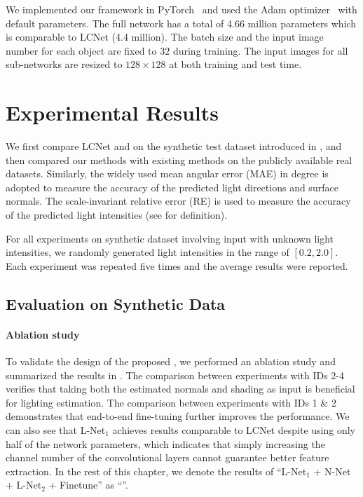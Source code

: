We implemented our framework in PyTorch~\cite{paszke2017pytorch} and used the Adam optimizer~\cite{kingma2014adam} with default parameters. 
The full network has a total of \num{4.66} million parameters which is comparable to LCNet (\num{4.4} million).
The batch size and the input image number for each object are fixed to $32$ during training.
The input images for all sub-networks are resized to $128\!\times\! 128$ at both training and test time.

\section{Experimental Results}
We first compare LCNet and \gcnetacronym on the synthetic test dataset \syntestMERL introduced in , and then compared our methods with existing methods on the publicly available real datasets. Similarly, the widely used mean angular error (MAE) in degree is adopted to measure the accuracy of the predicted light directions and surface normals. The scale-invariant relative error (RE) is used to measure the accuracy of the predicted light intensities (see  for definition). 

For all experiments on synthetic dataset involving input with unknown light intensities, we randomly generated light intensities in the range of $[0.2, 2.0]$. Each experiment was repeated five times and the average results were reported.

\subsection{Evaluation on Synthetic Data}
\label{subsec:synthetic_data}
\paragraph{Ablation study}
To validate the design of the proposed \gcnetacronym, we performed an ablation study and summarized the results in .
The comparison between experiments with IDs 2-4 verifies that taking both the estimated normals and shading as input is beneficial for lighting estimation.  
The comparison between experiments with IDs 1 \& 2 demonstrates that end-to-end fine-tuning further improves the performance.
We can also see that \hbox{L-Net$_1$} achieves results comparable to LCNet despite using only half of the network parameters, which indicates that simply increasing the channel number of the convolutional layers cannot guarantee better feature extraction. In the rest of this chapter, we denote the results of ``L-Net$_1$ + N-Net + L-Net$_2$ + Finetune'' as ``\gcnetacronym''.

